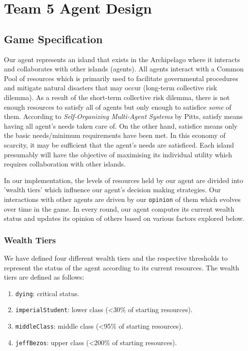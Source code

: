 \chapter{Team 5 Agent Design}
\section{Game Specification}
Our agent represents an island that exists in the Archipelago where it interacts and collaborates with other islands (agents). All agents interact with a Common Pool of resources which is primarily used to facilitate governmental procedures and mitigate natural disasters that may occur (long-term collective risk dilemma). As a result of the short-term collective risk dilemma, there is not enough resources to satisfy all of agents but only enough to satisfice \textit{some} of them. According to \textit{Self-Organizing Multi-Agent Systems} by Pitts, satisfy means having all agent's needs taken care of. On the other hand, satisfice means only the basic needs/minimum requirements have been met. In this economy of scarcity, it may be sufficient that the agent's needs are satisficed. Each island presumably will have the objective of maximising its individual utility which requires collaboration with other islands.

In our implementation, the levels of resources held by our agent are divided into 'wealth tiers' which influence our agent's decision making strategies. Our interactions with other agents are driven by our \texttt{opinion} of them which evolves over time in the game. In every round, our agent computes its current wealth status and updates its opinion of others based on various factors explored below.

\subsection{Wealth Tiers}
We have defined four different wealth tiers and the respective thresholds to represent the status of the agent according to its current resources. The wealth tiers are defined as follows:
\begin{enumerate}
    \item \texttt{dying}: critical status. 
    \item \texttt{imperialStudent}: lower class (<30\% of starting resources).
    \item \texttt{middleClass}: middle class (<95\% of starting resources).
    \item \texttt{jeffBezos}: upper class (<200\% of starting resources).
\end{enumerate}

